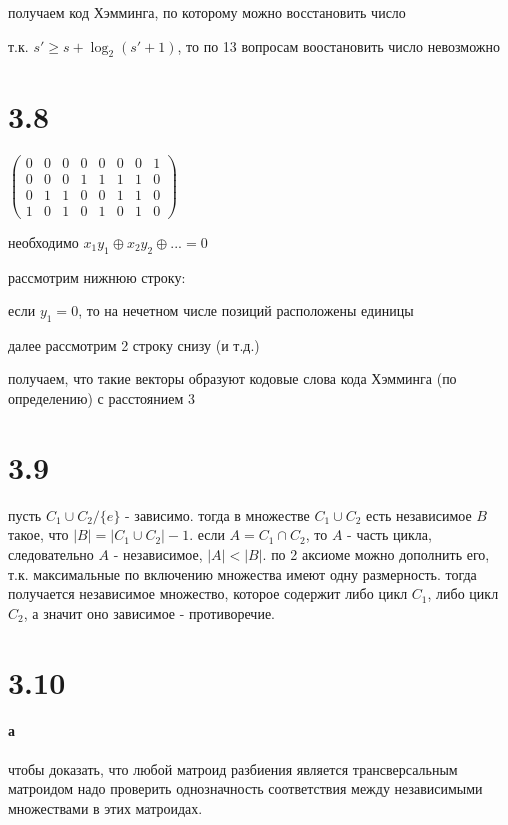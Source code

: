 \documentclass[russian]{article}
\begin{document}
получаем код Хэмминга, по которому можно восстановить число

т.к. $s' \ge s + \log _2 (s' + 1)$, то по 13 вопросам воостановить число невозможно

\section*{3.8}

$\begin{pmatrix}
0 & 0 & 0 & 0 & 0 & 0 & 0 & 1 \\
0 & 0 & 0 & 1 & 1 & 1 & 1 & 0 \\
0 & 1 & 1 & 0 & 0 & 1 & 1 & 0 \\
1 & 0 & 1 & 0 & 1 & 0 & 1 & 0
\end{pmatrix}$

необходимо $x_1 y_1 \oplus x_2 y_2 \oplus ... = 0$

рассмотрим нижнюю строку:

если $y_1 = 0$, то на нечетном числе позиций расположены единицы

далее рассмотрим 2 строку снизу (и т.д.)

получаем, что такие векторы образуют кодовые слова кода Хэмминга (по определению) с расстоянием 3

\section*{3.9}

пусть $C_1 \cup C_2 / \{e\}$ - зависимо. тогда в множестве $C_1 \cup C_2$ есть независимое $B$ такое, что $|B|=|C_1 \cup C_2| - 1$. если $A=C_1 \cap C_2$, то $A$ - часть цикла, следовательно $A$ - независимое, $|A| < |B|$. по 2 аксиоме можно дополнить его, т.к. максимальные по включению множества имеют одну размерность. тогда получается независимое множество, которое содержит либо цикл $C_1$, либо цикл $C_2$, а значит оно зависимое - противоречие.

\section*{3.10}

\paragraph{а}

чтобы доказать, что любой матроид разбиения является трансверсальным матроидом надо проверить однозначность соответствия между независимыми множествами в этих матроидах. 
\end{document}
